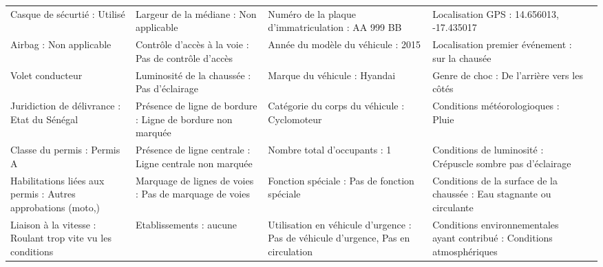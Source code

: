 \documentclass[a4paper,12pt,twoside,french]{book}
[a4paper,12pt,twoside]
\begin{document}
\begin{landscape}
\begin{table}[]
\begin{adjustbox}{width=2.1\textwidth,center=\textwidth}
\begin{tabular}{|l|l|l|l|l|}
Casque de sécurtié : Utilisé                                                                                         & Largeur de la médiane : Non applicable                      & Numéro de la plaque d'immatriculation : AA 999 BB                                   & Localisation GPS : 14.656013, -17.435017                                           &  \\
Airbag : Non applicable                                                                                              & Contrôle d'accès à la voie : Pas de contrôle d'accès        & Année du modèle du véhicule : 2015                                                  & Localisation premier événement : sur la chausée                                    &  \\
{\color[HTML]{196B24} Volet conducteur}                                                                              & Luminosité de la chaussée : Pas d'éclairage                 & Marque du véhicule : Hyandai                                                        & Genre de choc : De l'arrière vers les côtés                                        &  \\
Juridiction de délivrance : Etat du   Sénégal                                                                        & Présence de ligne de bordure : Ligne de bordure non marquée & Catégorie du corps du véhicule : Cyclomoteur                                        & Conditions météorologioques : Pluie                                                &  \\
Classe du permis : Permis A                                                                                          & Présence de ligne centrale : Ligne centrale non marquée     & Nombre total d'occupants : 1                                                        & Conditions de luminosité : Crépuscle sombre pas d'éclairage                        &  \\
Habilitations liées aux permis : Autres   approbations (moto,)                                                       & Marquage de lignes de voies : Pas de marquage de voies      & Fonction spéciale : Pas de fonction spéciale                                        & Conditions de la surface de la chaussée : Eau stagnante ou circulante              &  \\
Liaison à la vitesse : Roulant trop vite   vu les conditions                                                         & Etablissements : aucune                                     & Utilisation en véhicule d’urgence : Pas de véhicule d’urgence, Pas en   circulation & Conditions environnementales ayant contribué : Conditions atmosphériques           &  \\

\end{tabular}
\end{adjustbox}
\end{table}
\end{landscape}
\end{document}
